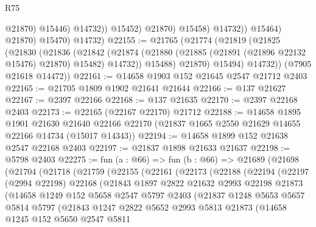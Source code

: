 \begin{lexlean}{R75}
\begin{coremodule}
                              @21870)
                            @15446)
                          @14732))
                      @15452)
                    @21870)
                  @15458)
                @14732))
            @15464)
          @21870)
        @15470)
      @14732)
@22155 := @21765
    (@21774
      (@21819
        (@21825
          (@21830
            (@21836
              (@21842
                (@21874 (@21880 (@21885 (@21891 (@21896 @22132 @15476) @21870) @15482) @14732))
                @15488)
              @21870)
            @15494)
          @14732))
      (@7905 @21618 @14472))
@22161 := @14658 @1903 @152 @21645 @2547 @21712 @2403
@22165 := @21705 @1809 @1902 @21641 @21644
@22166 := @137 @21627
@22167 := @2397 @22166
@22168 := @137 @21635
@22170 := @2397 @22168 @2403
@22173 := @22165 (@22167 @22170) @21712
@22188 := @14658
    @1895
    @1901
    @21630
    @21640
    @22166
    @22170
    (@21837 @1665 @2550 @21629 @14655 @22166 @14734 (@15017 @14343))
@22194 := @14658 @1899 @152 @21638 @2547 @22168 @2403
@22197 := @21837 @1898 @21633 @21637
@22198 := @5798 @2403
@22275 := fun (a : @66) =>
  fun (b : @66) =>
  @21689
    (@21698
      (@21704
        (@21718
          (@21759
            (@22155
              (@22161
                (@22173
                  (@22188
                    (@22194
                      (@22197
                        (@2994 @22198)
                        @22168
                        (@21843
                          @1897
                          @2822
                          @21632
                          @2993
                          @22198
                          @21873
                          (@14658
                            @1249
                            @152
                            @5658
                            @2547
                            @5797
                            @2403
                            (@21837
                              @1248
                              @5653
                              @5657
                              @5814
                              @5797
                              (@21843
                                @1247
                                @2822
                                @5652
                                @2993
                                @5813
                                @21873
                                (@14658
                                  @1245
                                  @152
                                  @5650
                                  @2547
                                  @5811

\end{coremodule}
\end{lexlean}
